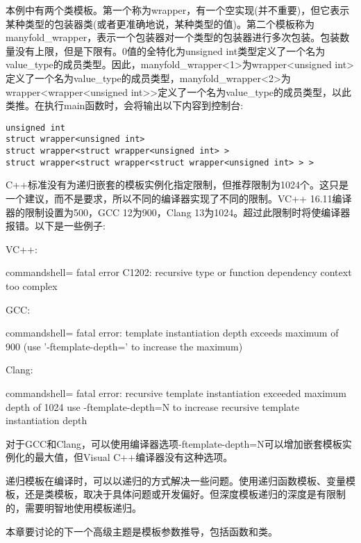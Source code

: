 本例中有两个类模板。第一个称为wrapper，有一个空实现(并不重要)，但它表示某种类型的包装器类(或者更准确地说，某种类型的值)。第二个模板称为manyfold\_wrapper，表示一个包装器对一个类型的包装器进行多次包装。包装数量没有上限，但是下限有。0值的全特化为unsigned int类型定义了一个名为value\_type的成员类型。因此，manyfold\_wrapper<1>为wrapper<unsigned int>定义了一个名为value\_type的成员类型，manyfold\_wrapper<2>为wrapper<wrapper<unsigned int>>定义了一个名为value\_type的成员类型，以此类推。在执行main函数时，会将输出以下内容到控制台:

\begin{lstlisting}[style=styleCXX]
unsigned int
struct wrapper<unsigned int>
struct wrapper<struct wrapper<unsigned int> >
struct wrapper<struct wrapper<struct wrapper<unsigned int> > >
\end{lstlisting}

C++标准没有为递归嵌套的模板实例化指定限制，但推荐限制为1024个。这只是一个建议，而不是要求，所以不同的编译器实现了不同的限制。VC++ 16.11编译器的限制设置为500，GCC 12为900，Clang 13为1024。超过此限制时将使编译器报错。以下是一些例子:

VC++:

\begin{tcblisting}{commandshell={}}
fatal error C1202: recursive type or function dependency
context too complex
\end{tcblisting}

GCC:

\begin{tcblisting}{commandshell={}}
fatal error: template instantiation depth exceeds maximum of
900 (use '-ftemplate-depth=' to increase the maximum)
\end{tcblisting}

Clang:

\begin{tcblisting}{commandshell={}}
fatal error: recursive template instantiation exceeded maximum
depth of 1024
use -ftemplate-depth=N to increase recursive template
instantiation depth
\end{tcblisting}

对于GCC和Clang，可以使用编译器选项-ftemplate-depth=N可以增加嵌套模板实例化的最大值，但Visual C++编译器没有这种选项。

递归模板在编译时，可以以递归的方式解决一些问题。使用递归函数模板、变量模板，还是类模板，取决于具体问题或开发偏好。但深度模板递归的深度是有限制的，需要明智地使用模板递归。

本章要讨论的下一个高级主题是模板参数推导，包括函数和类。





